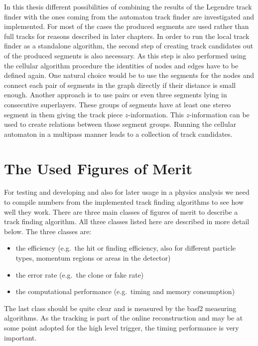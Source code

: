 In this thesis different possibilities of combining the results of the Legendre track finder with the ones coming from the automaton track finder are investigated and implemented. For most of the cases the produced segments are used rather than full tracks for reasons described in later chapters. In order to run the local track finder as a standalone algorithm, the second step of creating track candidates out of the produced segments is also necessary. As this step is also performed using the cellular algorithm procedure the identities of nodes and edges have to be defined again. One natural choice would be to use the segments for the nodes and connect each pair of segments in the graph directly if their distance is small enough. Another approach is to use pairs or even three segments lying in consecutive superlayers. These groups of segments have at least one stereo segment in them giving the track piece $z$-information. This $z$-information can be used to create relations between those segment groups. Running the cellular automaton in a multipass manner leads to a collection of track candidates.


\section{The Used Figures of Merit}

For testing and developing and also for later usage in a physics analysis we need to compile numbers from the implemented track finding algorithms to see how well they work. There are three main classes of figures of merit to describe a track finding algorithm. All three classes listed here are described in more detail below. The three classes are:
\begin{itemize}
  \item the efficiency (e.g.\ the hit or finding efficiency, also for different particle types, momentum regions or areas in the detector)
  \item the error rate (e.g.\ the clone or fake rate)
  \item the computational performance (e.g.\ timing and memory consumption)
\end{itemize}

The last class should be quite clear and is measured by the basf2 measuring algorithms. As the tracking is part of the online reconstruction and may be at some point adopted for the high level trigger, the timing performance is very important. 

